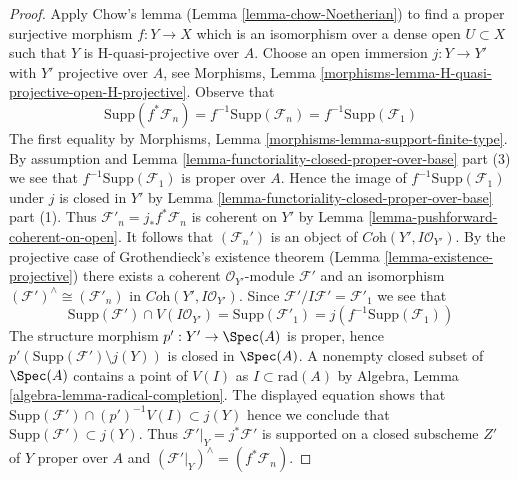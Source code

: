 \begin{proof}
\medskip\noindent
Apply Chow's lemma (Lemma \ref{lemma-chow-Noetherian}) to find a
proper surjective morphism $f : Y \to X$ which is an isomorphism
over a dense open $U \subset X$ such that $Y$ is H-quasi-projective
over $A$. Choose an open immersion $j : Y \to Y'$ with
$Y'$ projective over $A$, see
Morphisms, Lemma \ref{morphisms-lemma-H-quasi-projective-open-H-projective}.
Observe that
$$
\text{Supp}(f^*\mathcal{F}_n) = f^{-1}\text{Supp}(\mathcal{F}_n) =
f^{-1}\text{Supp}(\mathcal{F}_1)
$$
The first equality by
Morphisms, Lemma \ref{morphisms-lemma-support-finite-type}.
By assumption and
Lemma \ref{lemma-functoriality-closed-proper-over-base} part (3)
we see that $f^{-1}\text{Supp}(\mathcal{F}_1)$ is proper over $A$.
Hence the image of $f^{-1}\text{Supp}(\mathcal{F}_1)$
under $j$ is closed in $Y'$ by
Lemma \ref{lemma-functoriality-closed-proper-over-base} part (1).
Thus $\mathcal{F}'_n = j_*f^*\mathcal{F}_n$ is coherent on
$Y'$ by Lemma \ref{lemma-pushforward-coherent-on-open}.
It follows that $(\mathcal{F}_n')$
is an object of $\textit{Coh}(Y', I\mathcal{O}_{Y'})$.
By the projective case of Grothendieck's existence theorem
(Lemma \ref{lemma-existence-projective})
there exists a coherent $\mathcal{O}_{Y'}$-module
$\mathcal{F}'$ and an isomorphism
$(\mathcal{F}')^\wedge \cong (\mathcal{F}'_n)$ in
$\textit{Coh}(Y', I\mathcal{O}_{Y'})$.
Since $\mathcal{F}'/I\mathcal{F}' = \mathcal{F}'_1$ we see that
$$
\text{Supp}(\mathcal{F}') \cap V(I\mathcal{O}_{Y'}) =
\text{Supp}(\mathcal{F}'_1) = j(f^{-1}\text{Supp}(\mathcal{F}_1))
$$
The structure morphism $p' : Y' \to \Spec(A)$ is proper, hence
$p'(\text{Supp}(\mathcal{F}') \setminus j(Y))$
is closed in $\Spec(A)$. A nonempty closed subset of $\Spec(A)$
contains a point of $V(I)$ as $I \subset \text{rad}(A)$
by Algebra, Lemma \ref{algebra-lemma-radical-completion}.
The displayed equation shows that
$\text{Supp}(\mathcal{F}') \cap (p')^{-1}V(I) \subset j(Y)$
hence we conclude that $\text{Supp}(\mathcal{F}') \subset j(Y)$.
Thus $\mathcal{F}'|_Y = j^*\mathcal{F}'$
is supported on a closed subscheme $Z'$ of $Y$ proper over $A$
and $(\mathcal{F}'|_Y)^\wedge = (f^*\mathcal{F}_n)$.


\end{proof}
